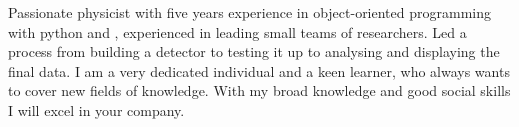 Passionate physicist with five years experience in object-oriented programming with python and \cpp, experienced in leading small teams of researchers.
Led a process from building a detector to testing it up to analysing and displaying the final data.
I am a very dedicated individual and a keen learner, who always wants to cover new fields of knowledge.
With my broad knowledge and good social skills I will excel in your company.\par

